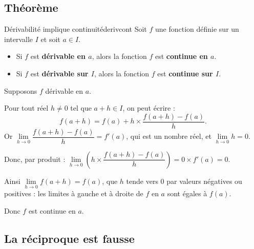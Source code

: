 \documentclass[11pt,a4paper]{article}
\newcommand{\limite}[2]{\lim\limits_{#1}#2}
\begin{document}
\subsection{Théorème}

\begin{theoreme}{Dérivabilité implique continuité}{derivcont}
Soit $f$ une fonction définie sur un intervalle $I$ et soit $a\in I$.
\begin{itemize}
  \item Si $f$ est \textbf{dérivable en $a$}, alors la fonction $f$ est
        \textbf{continue en $a$}.
  \item Si $f$ est \textbf{dérivable sur $I$}, alors la fonction $f$ est
        \textbf{continue sur $I$}.
\end{itemize}
\end{theoreme}

\begin{demo}
Supposons $f$ dérivable en $a$.

Pour tout réel $h\neq 0$ tel que $a+h\in I$, on peut écrire :
\[
  f(a+h) = f(a) + h\times\frac{f(a+h)-f(a)}{h}.
\]
Or $\limite{h\to 0}{\dfrac{f(a+h)-f(a)}{h}}=f'(a)$, qui est un nombre réel, et
$\limite{h\to 0}{h}=0$.

Donc, par produit : $\limite{h\to 0}{\left(h\times\dfrac{f(a+h)-f(a)}{h}\right)}
=0\times f'(a)=0$.

Ainsi $\limite{h\to 0}{f(a+h)}=f(a)$, que $h$ tende vers $0$ par valeurs
négatives ou positives : les limites à gauche et à droite de $f$ en $a$ sont
égales à $f(a)$.

Donc $f$ est continue en $a$.
\end{demo}

\subsection{La réciproque est fausse}
\end{document}
